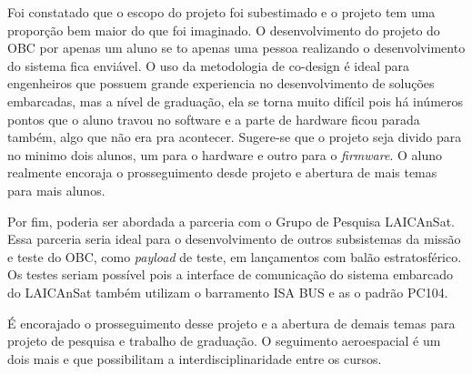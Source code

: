Foi constatado que o escopo do projeto foi subestimado e o projeto tem uma proporção bem maior do que foi imaginado. O desenvolvimento do projeto do OBC por apenas um aluno se to apenas uma pessoa realizando o desenvolvimento do sistema fica enviável. O uso da metodologia de co-design é ideal para engenheiros que possuem grande experiencia no desenvolvimento de soluções embarcadas, mas a nível de graduação, ela se torna muito difícil pois há inúmeros pontos que o aluno travou no software e a parte de hardware ficou parada também, algo que não era pra acontecer. Sugere-se que o projeto seja divido para no minimo dois alunos, um para o hardware e outro para o \textit{firmware}. O aluno realmente encoraja o prosseguimento desde projeto e abertura de mais temas para mais alunos.


Por fim, poderia ser abordada a parceria com o Grupo de Pesquisa LAICAnSat. Essa parceria seria ideal para o desenvolvimento de outros subsistemas da missão e teste do OBC, como \textit{payload} de teste, em lançamentos com balão estratosférico. Os testes seriam possível pois a interface de comunicação do sistema embarcado do LAICAnSat também utilizam o barramento ISA BUS e as o padrão PC104. 

É encorajado o prosseguimento desse projeto e a abertura de demais temas para projeto de pesquisa e trabalho de graduação. O seguimento aeroespacial é um dois mais e que possibilitam a interdisciplinaridade entre os cursos.
